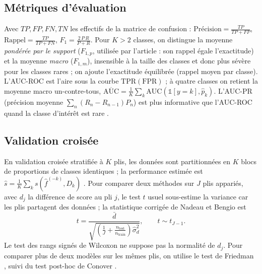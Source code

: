 \subsection{Métriques d'évaluation}
Avec $TP,FP,FN,TN$ les effectifs de la matrice de confusion : $\text{Précision}=\frac{TP}{TP+FP}$, $\text{Rappel}=\frac{TP}{TP+FN}$, $F_1=\frac{2\,P\,R}{P+R}$. Pour $K>2$ classes, on distingue la moyenne \emph{pondérée par le support} ($F_{1,p}$, utilisée par l'article : son rappel égale l'exactitude) et la moyenne \emph{macro} ($F_{1,m}$), insensible à la taille des classes et donc plus sévère pour les classes rares ; on ajoute l'exactitude équilibrée (rappel moyen par classe). L'AUC-ROC \cite{fawcett2006} est l'aire sous la courbe $\text{TPR}(\text{FPR})$ ; à quatre classes on retient la moyenne macro un-contre-tous, $\overline{\text{AUC}}=\frac1K\sum_k \text{AUC}(\mathbb 1[y=k],\hat p_k)$. L'AUC-PR (précision moyenne $\sum_n (R_n-R_{n-1})P_n$) est plus informative que l'AUC-ROC quand la classe d'intérêt est rare \cite{saito2015}.

\subsection{Validation croisée}
En validation croisée stratifiée à $K$ plis, les données sont partitionnées en $K$ blocs de proportions de classes identiques ; la performance estimée est $\hat s=\frac1K\sum_{k}s(\hat f^{(-k)},D_k)$ \cite{kohavi1995}. Pour comparer deux méthodes sur $J$ plis appariés, avec $d_j$ la différence de score au pli $j$, le test $t$ usuel sous-estime la variance car les plis partagent des données ; la statistique corrigée de Nadeau et Bengio \cite{nadeau2003} est
\begin{equation}
t=\frac{\bar d}{\sqrt{\left(\frac1J+\frac{n_{\text{test}}}{n_{\text{train}}}\right)\hat\sigma_d^{2}}},\qquad t\sim t_{J-1}.
\end{equation}
Le test des rangs signés de Wilcoxon \cite{wilcoxon1945} ne suppose pas la normalité de $d_j$. Pour comparer plus de deux modèles sur les mêmes plis, on utilise le test de Friedman \cite{friedman1937,demsar2006}, suivi du test post-hoc de Conover \cite{conover1999,pereira2015}.

